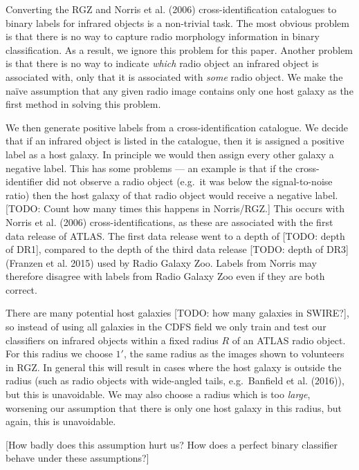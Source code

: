 \documentclass[fleqn,usenatbib,usedcolumn]{mnras}
\begin{document}
    Converting the RGZ and Norris et al. (2006) cross-identification
    catalogues to binary labels for infrared objects is a non-trivial task.
    The most obvious problem is that there is no way to capture radio
    morphology information in binary classification. As a result, we ignore
    this problem for this paper. Another problem is that there is no way to
    indicate \emph{which} radio object an infrared object is associated
    with, only that it is associated with \emph{some} radio object. We make
    the naïve assumption that any given radio image contains only one host
    galaxy as the first method in solving this problem.

    We then generate positive labels from a cross-identification catalogue.
    We decide that if an infrared object is listed in the catalogue, then it
    is assigned a positive label as a host galaxy. In principle we would
    then assign every other galaxy a negative label. This has some problems
    --- an example is that if the cross-identifier did not observe a radio
    object (e.g.~it was below the signal-to-noise ratio) then the host
    galaxy of that radio object would receive a negative label. {[}TODO:
    Count how many times this happens in Norris/RGZ.{]} This occurs with
    Norris et al. (2006) cross-identifications, as these are associated with
    the first data release of ATLAS. The first data release went to a depth
    of {[}TODO: depth of DR1{]}, compared to the depth of the third data
    release {[}TODO: depth of DR3{]} (Franzen et al. 2015) used by Radio
    Galaxy Zoo. Labels from Norris may therefore disagree with labels from
    Radio Galaxy Zoo even if they are both correct.

    There are many potential host galaxies {[}TODO: how many galaxies in
    SWIRE?{]}, so instead of using all galaxies in the CDFS field we only
    train and test our classifiers on infrared objects within a fixed radius
    \(R\) of an ATLAS radio object. For this radius we choose \(1'\), the
    same radius as the images shown to volunteers in RGZ. In general this
    will result in cases where the host galaxy is outside the radius (such
    as radio objects with wide-angled tails, e.g.~Banfield et al. (2016)),
    but this is unavoidable. We may also choose a radius which is too
    \emph{large}, worsening our assumption that there is only one host
    galaxy in this radius, but again, this is unavoidable.

    {[}How badly does this assumption hurt us? How does a perfect binary
    classifier behave under these assumptions?{]}
\end{document}
